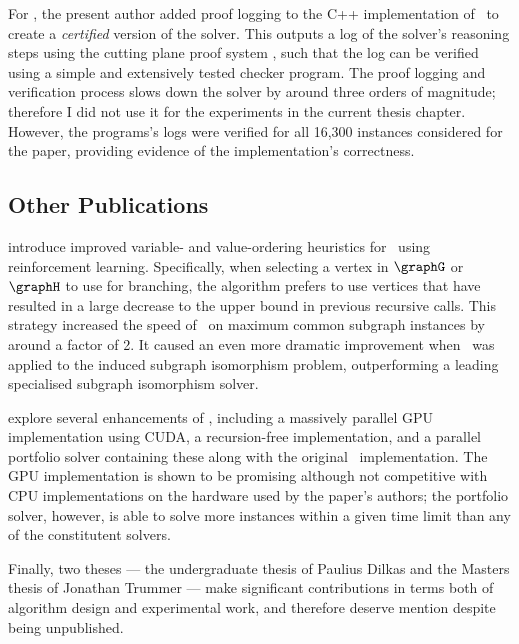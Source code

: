For \citet{DBLP:conf/cp/GochtMMNPT20}, the present
author added proof logging \citep{DBLP:conf/ijcai/GochtMN20} to the C++ implementation of
\McSplit\ to create a \emph{certified} version of the solver.  This outputs a log of the
solver's reasoning steps using the cutting plane proof system
\citep{DBLP:journals/dam/CookCT87}, such that the log can be verified using a
simple and extensively tested checker program.  The proof logging and verification process
slows down the solver by around three orders of magnitude; therefore I did not use it for
the experiments in the current thesis chapter.  However, the programs's logs were verified
for all 16,300 instances considered for the paper, providing evidence of the implementation's
correctness.

\subsection{Other Publications}

\citet{DBLP:conf/aaai/0001LJ020} introduce improved variable- and value-ordering
heuristics for \McSplit\ using reinforcement learning.
Specifically, when selecting a vertex in $\graphG$ or $\graphH$ to use for branching,
the algorithm prefers to use vertices that have resulted in a large decrease to the upper bound
in previous recursive calls.  This strategy increased the speed of \McSplit\ on maximum common subgraph
instances by around a factor of 2.  It caused an even more dramatic improvement when \McSplit\ was
applied to the induced subgraph isomorphism problem, outperforming a leading specialised subgraph
isomorphism solver.

\citet{DBLP:journals/computation/QuerMS20}
explore several enhancements of \McSplit,
including a massively parallel GPU implementation using CUDA, a recursion-free implementation,
and a parallel portfolio solver containing these along with the original \McSplit\
implementation.  The GPU implementation is shown to be promising although not competitive
with CPU implementations on the hardware used by the paper's authors; the portfolio solver,
however, is able to solve more instances within a given time limit than any of the
constitutent solvers.

Finally, two theses --- the undergraduate thesis of Paulius Dilkas and
the Masters thesis of Jonathan Trummer --- make significant contributions
in terms both of algorithm design and experimental work, and therefore
deserve mention despite being unpublished.

